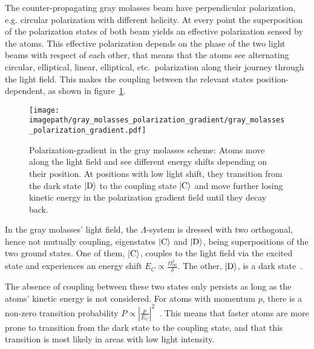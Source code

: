 The counter-propagating gray molasses beam have perpendicular polarization, e.g. circular polarization with different helicity. At every point the superposition of the polarization states of both beam yields an effective polarization sensed by the atoms. This effective polarization depends on the phase of the two light beams with respect of each other, that means that the atoms see alternating circular, elliptical, linear, elliptical, etc.~polarization along their journey through the light field. This makes the coupling between the relevant states position-dependent, as shown in figure~\ref{fig:gray_molasses_polarization_gradient}.

\begin{figure}
    \centering
    \texttt{[image: \\imagepath/gray\_molasses\_polarization\_gradient/gray\_molasses\_polarization\_gradient.pdf]}
    \caption{Polarization-gradient in the gray molasses scheme: Atoms move along the light field and see different energy shifts depending on their position. At positions with low light shift, they transition from the dark state $\Ket{\text{D}}$ to the coupling state $\Ket{\text{C}}$ and move further losing kinetic energy in the polarization gradient field until they decay back.}\label{fig:gray_molasses_polarization_gradient}
\end{figure}

In the gray molasses' light field, the $\Lambda$-system is dressed with two orthogonal, hence not mutually coupling, eigenstates $\Ket{\text{C}}$ and $\Ket{\text{D}}$, being superpositions of the two ground states. One of them, $\Ket{\text{C}}$, couples to the light field via the excited state and experiences an energy shift $E_C \propto \frac{\Omega_\text{eff}^2}{\delta}$. The other, $\Ket{\text{D}}$, is a dark state~\cite{weidemuller_novel_1994,gerken_gray_2016}.

The absence of coupling between these two states only persists as long as the atoms' kinetic energy is not considered. For atoms with momentum $p$, there is a non-zero transition probability $P \propto \left|\frac{p}{E_C} \right|^2$~\cite{weidemuller_novel_1994}. This means that faster atoms are more prone to transition from the dark state to the coupling state, and that this transition is most likely in areas with low light intensity.

